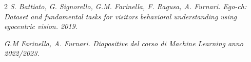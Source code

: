 \begin{thebibliography}{2}
    \emph{S. Battiato, G. Signorello, G.M. Farinella, F. Ragusa, A. Furnari. Ego-ch: Dataset and fundamental tasks for visitors behavioral understanding using egocentric vision. 2019.}

    \emph{G.M Farinella, A. Furnari. Diapositive del corso di Machine Learning anno 2022/2023.}
\end{thebibliography}
    
